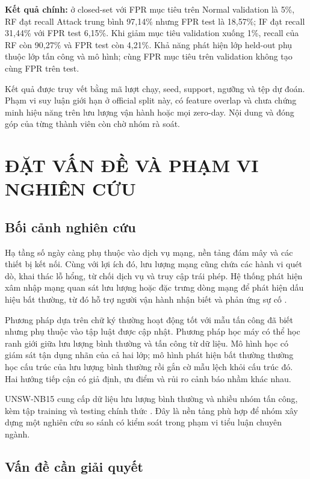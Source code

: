 \documentclass[12pt,a4paper,oneside]{report}
\begin{document}
\textbf{Kết quả chính:} ở closed-set với FPR mục tiêu trên Normal validation là 5\%, RF đạt recall Attack trung bình 97,14\% nhưng FPR test là 18,57\%; IF đạt recall 31,44\% với FPR test 6,15\%. Khi giảm mục tiêu validation xuống 1\%, recall của RF còn 90,27\% và FPR test còn 4,21\%. Khả năng phát hiện lớp held-out phụ thuộc lớp tấn công và mô hình; cùng FPR mục tiêu trên validation không tạo cùng FPR trên test.

Kết quả được truy vết bằng mã lượt chạy, seed, support, ngưỡng và tệp dự đoán. Phạm vi suy luận giới hạn ở official split này, có feature overlap và chưa chứng minh hiệu năng trên lưu lượng vận hành hoặc mọi zero-day. Nội dung và đóng góp của từng thành viên còn chờ nhóm rà soát.

\clearpage{}
\chapter{ĐẶT VẤN ĐỀ VÀ PHẠM VI NGHIÊN CỨU}

\section{Bối cảnh nghiên cứu}

Hạ tầng số ngày càng phụ thuộc vào dịch vụ mạng, nền tảng đám mây và các thiết bị kết nối. Cùng với lợi ích đó, lưu lượng mạng cũng chứa các hành vi quét dò, khai thác lỗ hổng, từ chối dịch vụ và truy cập trái phép. Hệ thống phát hiện xâm nhập mạng quan sát lưu lượng hoặc đặc trưng dòng mạng để phát hiện dấu hiệu bất thường, từ đó hỗ trợ người vận hành nhận biết và phản ứng sự cố \cite{nist80094}.

Phương pháp dựa trên chữ ký thường hoạt động tốt với mẫu tấn công đã biết nhưng phụ thuộc vào tập luật được cập nhật. Phương pháp học máy có thể học ranh giới giữa lưu lượng bình thường và tấn công từ dữ liệu. Mô hình học có giám sát tận dụng nhãn của cả hai lớp; mô hình phát hiện bất thường thường học cấu trúc của lưu lượng bình thường rồi gắn cờ mẫu lệch khỏi cấu trúc đó. Hai hướng tiếp cận có giả định, ưu điểm và rủi ro cảnh báo nhầm khác nhau.

UNSW-NB15 cung cấp dữ liệu lưu lượng bình thường và nhiều nhóm tấn công, kèm tập training và testing chính thức \cite{moustafa2015,moustafa2016,unswsite}. Đây là nền tảng phù hợp để nhóm xây dựng một nghiên cứu so sánh có kiểm soát trong phạm vi tiểu luận chuyên ngành.

\section{Vấn đề cần giải quyết}
\end{document}
